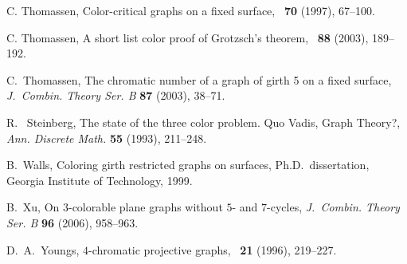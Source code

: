 \documentclass{article}
\begin{document}
\begin{thebibliography}{99}
 C. Thomassen, Color-critical graphs on a fixed surface,
\JCTB\ {\bf70} (1997), 67--100.

 C. Thomassen,
A short list color proof of Grotzsch's theorem,
\JCTB\ {\bf88} (2003), 189--192.

 C.~Thomassen,
The chromatic number of a graph of girth 5 on a fixed surface,
{\em J.~Combin. Theory Ser. B} {\bf 87} (2003), 38--71.

 R.~ Steinberg,
The state of the three color problem. Quo Vadis, Graph Theory?,
{\em Ann. Discrete Math.} {\bf 55} (1993), 211--248.

 B.~Walls, Coloring girth restricted graphs on surfaces,
Ph.D.\ dissertation, Georgia Institute of Technology, 1999.

 B.~Xu,
On $3$-colorable plane graphs without $5$- and $7$-cycles, {\em J.~Combin. Theory Ser. B} {\bf 96} (2006), 958--963.

 D.~A.~Youngs, $4$-chromatic projective graphs,
\JGT\ {\bf21} (1996), 219--227.

\end{thebibliography}
\end{document}

